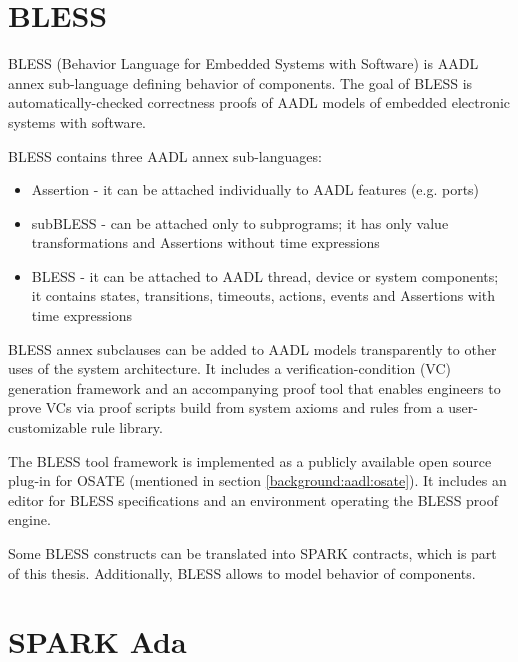 \section{BLESS}
\label{background:bless}
BLESS (Behavior Language for Embedded Systems with Software) is AADL annex sub-language defining behavior of components. The goal of BLESS is automatically-checked correctness proofs of AADL models of embedded electronic systems with software.

BLESS contains three AADL annex sub-languages:
\begin{itemize} \itemsep1pt \parskip0pt 
	\item Assertion - it can be attached individually to AADL features (e.g. ports)
	\item subBLESS - can be attached only to subprograms; it has only value transformations and Assertions without time expressions
	\item BLESS - it can be attached to AADL thread, device or system components; it contains states, transitions, timeouts, actions, events and Assertions with time expressions
\end{itemize}

BLESS annex subclauses can be added to AADL models transparently to other uses of the system architecture. It includes a verification-condition (VC) generation framework and an accompanying proof tool that enables engineers to prove VCs via proof scripts build from system axioms and rules from a user-customizable rule library. \cite{Bless:Paper}

The BLESS tool framework is implemented as a publicly available open source plug-in for OSATE (mentioned in section \ref{background:aadl:osate}). It includes an editor for BLESS specifications and an environment operating the BLESS proof engine. \cite{Bless:Paper}

Some BLESS constructs can be translated into SPARK contracts, which is part of this thesis. Additionally, BLESS allows to model behavior of components.



\section{SPARK Ada}
\label{background:spark}


